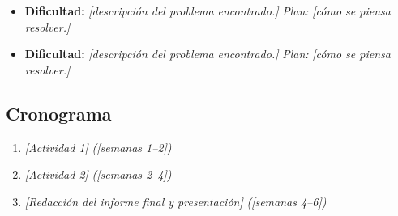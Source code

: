 \documentclass[11pt,letterpaper]{article}
\theoremstyle{plain}
\theoremstyle{definition}
\theoremstyle{remark}
\numberwithin{equation}{section}
\newcommand{\ph}[1]{\textcolor{red!70!black}{\textit{[#1]}}}
\begin{document}
	\begin{itemize}[leftmargin=2em]
		\item \textbf{Dificultad:} \ph{descripción del problema encontrado.}
		\emph{Plan:} \ph{cómo se piensa resolver.}
		\item \textbf{Dificultad:} \ph{descripción del problema encontrado.}
		\emph{Plan:} \ph{cómo se piensa resolver.}
	\end{itemize}
	
	\subsection{Cronograma}
	
	\begin{enumerate}[leftmargin=2em]
		\item \ph{Actividad 1} \hfill \emph{(\ph{semanas 1--2})}
		\item \ph{Actividad 2} \hfill \emph{(\ph{semanas 2--4})}
		\item \ph{Redacción del informe final y presentación} \hfill \emph{(\ph{semanas 4--6})}
	\end{enumerate}
	
	\clearpage
	
\end{document}
